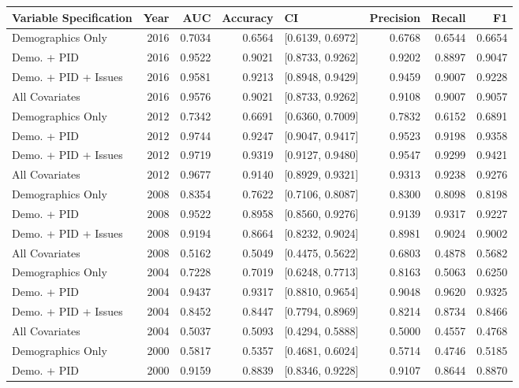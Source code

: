 \begin{longtable}{lrrrlrrr}
  \toprule
Variable Specification & Year & AUC & Accuracy & CI & Precision & Recall & F1 \\ 
  \midrule
Demographics Only & 2016 & 0.7034 & 0.6564 & [0.6139, 0.6972] & 0.6768 & 0.6544 & 0.6654 \\ 
  Demo. + PID & 2016 & 0.9522 & 0.9021 & [0.8733, 0.9262] & 0.9202 & 0.8897 & 0.9047 \\ 
  Demo. + PID + Issues & 2016 & 0.9581 & 0.9213 & [0.8948, 0.9429] & 0.9459 & 0.9007 & 0.9228 \\ 
  All Covariates & 2016 & 0.9576 & 0.9021 & [0.8733, 0.9262] & 0.9108 & 0.9007 & 0.9057 \\ 
  Demographics Only & 2012 & 0.7342 & 0.6691 & [0.6360, 0.7009] & 0.7832 & 0.6152 & 0.6891 \\ 
  Demo. + PID & 2012 & 0.9744 & 0.9247 & [0.9047, 0.9417] & 0.9523 & 0.9198 & 0.9358 \\ 
  Demo. + PID + Issues & 2012 & 0.9719 & 0.9319 & [0.9127, 0.9480] & 0.9547 & 0.9299 & 0.9421 \\ 
  All Covariates & 2012 & 0.9677 & 0.9140 & [0.8929, 0.9321] & 0.9313 & 0.9238 & 0.9276 \\ 
  Demographics Only & 2008 & 0.8354 & 0.7622 & [0.7106, 0.8087] & 0.8300 & 0.8098 & 0.8198 \\ 
  Demo. + PID & 2008 & 0.9522 & 0.8958 & [0.8560, 0.9276] & 0.9139 & 0.9317 & 0.9227 \\ 
  Demo. + PID + Issues & 2008 & 0.9194 & 0.8664 & [0.8232, 0.9024] & 0.8981 & 0.9024 & 0.9002 \\ 
  All Covariates & 2008 & 0.5162 & 0.5049 & [0.4475, 0.5622] & 0.6803 & 0.4878 & 0.5682 \\ 
  Demographics Only & 2004 & 0.7228 & 0.7019 & [0.6248, 0.7713] & 0.8163 & 0.5063 & 0.6250 \\ 
  Demo. + PID & 2004 & 0.9437 & 0.9317 & [0.8810, 0.9654] & 0.9048 & 0.9620 & 0.9325 \\ 
  Demo. + PID + Issues & 2004 & 0.8452 & 0.8447 & [0.7794, 0.8969] & 0.8214 & 0.8734 & 0.8466 \\ 
  All Covariates & 2004 & 0.5037 & 0.5093 & [0.4294, 0.5888] & 0.5000 & 0.4557 & 0.4768 \\ 
  Demographics Only & 2000 & 0.5817 & 0.5357 & [0.4681, 0.6024] & 0.5714 & 0.4746 & 0.5185 \\ 
  Demo. + PID & 2000 & 0.9159 & 0.8839 & [0.8346, 0.9228] & 0.9107 & 0.8644 & 0.8870 \\ 

\end{longtable}
